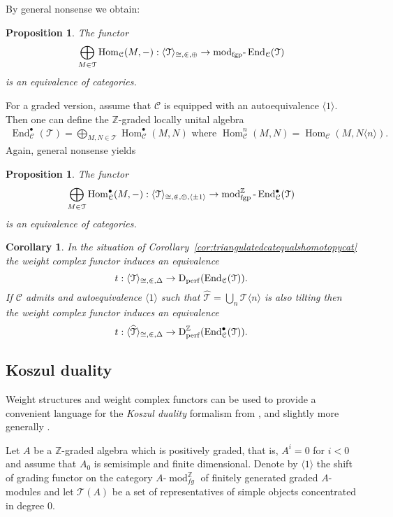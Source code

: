 \documentclass{amsart}
\theoremstyle{plain}
\newtheorem{proposition}[theorem]{Proposition}
\newtheorem{corollary}[theorem]{Corollary}
\theoremstyle{TheoremNum}
\theoremstyle{definition}
\theoremstyle{remark}
\numberwithin{equation}{section}
\newcommand{\Z}{\mathbb{Z}}
\newcommand{\Cc}{\mathcal{C}}
\newcommand{\Tt}{\mathcal{T}}
\newcommand{\Dperf}{\operatorname{D_{perf}}}
\newcommand{\DperfZ}{\operatorname{D}^\Z_{\operatorname{perf}}}
\newcommand{\Hom}{\operatorname{Hom}}
\newcommand{\End}{\operatorname{End}}
\begin{document}
By general nonsense we obtain:
\begin{proposition} The functor
$$\bigoplus_{M\in \Tt}\Hom_\Cc(M,-): \langle \Tt \rangle_{\cong, \inplus, \oplus} \to \operatorname{mod_{fgp}-}\End_\Cc(\Tt)$$
is an equivalence of categories.
\end{proposition}
 For a graded version, assume that $\Cc$ is equipped with an autoequivalence $\langle 1\rangle.$
Then one can define the $\Z$-graded locally unital algebra
\begin{align}\label{eq:gradedend}
\End_\Cc^\bullet(\Tt)=\bigoplus_{M,N\in \Tt} \Hom^\bullet_\Cc(M,N) \text{ where }\Hom^n_\Cc(M,N)=\Hom_\Cc(M,N\langle n\rangle).
\end{align}
Again, general nonsense yields
\begin{proposition}\label{prop:gradedcatasmodules} The functor
$$\bigoplus_{M\in \Tt}\Hom^\bullet_\Cc(M,-): \langle \Tt \rangle_{\cong, \inplus, \oplus,\langle \pm 1\rangle} \to \operatorname{mod}^\Z_{\operatorname{fgp}}\operatorname{-}\End_\Cc^\bullet(\Tt)$$
is an equivalence of categories.
\end{proposition}
\begin{corollary} \label{cor:triangulatedcatequalsmodulecat}
In the situation of Corollary~\ref{cor:triangulatedcatequalshomotopycat} the weight complex functor induces an equivalence
$$t:\langle \Tt \rangle_{\cong, \inplus, \Delta}\to \Dperf(\End_\Cc(\Tt)).$$
If $\Cc$ admits and autoequivalence $\langle 1\rangle$ such that $\widehat{\Tt}=\bigcup_n \Tt\langle n\rangle$ is also tilting then the weight complex functor induces an equivalence
$$t:\langle \widehat{\Tt} \rangle_{\cong, \inplus, \Delta}\to \DperfZ(\End^\bullet_\Cc(\Tt)).$$
\end{corollary}
\subsection{Koszul duality} Weight structures and weight complex functors can be used to provide a
convenient language for the \emph{Koszul duality} formalism from \cite{beilinson_koszul_1996}, and slightly more generally  \cite{mazorchuk_quadratic_2009}. 

Let $A$ be a $\Z$-graded algebra which is positively graded, that is, $A^i=0$ for $i<0$ and assume that $A_0$ is semisimple and finite dimensional. Denote by $\langle1\rangle$ the shift of grading functor on the category $A\text{-}\operatorname{mod}_{fg}^\Z$ of finitely generated graded $A$-modules and let $\Tt(A)$ be a set of representatives of simple objects concentrated in degree $0.$
\end{document}
